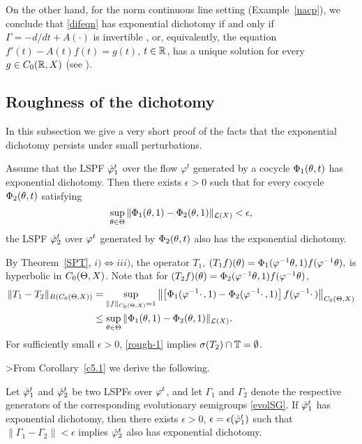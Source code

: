 On the other hand, for the norm continuous line setting
(Example~\ref{nacp}), we conclude that \eqref{difeqn} has
exponential dichotomy if and only if $\Gamma=-d/dt+A(\cdot)$ is
invertible \cite{Gohb,Palm}, or, equivalently,  the equation
$f'(t)-A(t)f(t)=g(t)$, $t\in{\Bbb{R}}$, has a unique solution for every
$g\in C_0({\Bbb{R}},X)$ (see \cite{DK,MS}).

\subsection{Roughness of the dichotomy}

In this subsection we give a very short proof of the facts that the
exponential dichotomy persists under small perturbations.

\begin{thm}
Assume that the LSPF ${\hat{\varphi}}^t_1$ over the flow $\varphi^t$
generated by a cocycle $\Phi_1(\theta,t)$ has exponential dichotomy.
Then there exists $\epsilon > 0$ such that for every cocycle
$\Phi_2(\theta,t)$ satisfying
\begin{equation}\lb{rough-1}
\sup\sb{\th\in \TH} \|\Phi_1(\th,1)-\Phi_2(\th,1) \|_{\calL(X)}<\epsilon,
\end{equation}
the LSPF ${\hat{\varphi}}^t_2$ over $\varphi^t$ generated by
$\Phi_2(\theta,t)$ also has the exponential dichotomy.
\end{thm}

\begin{pf}
By Theorem~\ref{SPT}, $i)\Leftrightarrow iii)$, the operator
$T_1$, $(T_1f)(\theta) = \Phi_1(\varphi^{-1}\theta,1) f(\varphi^{-1}\theta), $ is
hyperbolic in $C_0(\Theta,X)$.  Note that for $(T_2f)(\theta)=\Phi_2(\varphi^{-1}\theta,
1)f(\varphi^{-1}\theta)$,
$$\begin{aligned}
\|T_1 - T_2\|_{B(C_0(\Theta,X))} &= \sup\sb{\|f\|_{C_0(\Theta,X)}=1} \left\|\left[\Phi_1
(\varphi^{-1}\cdot\,,1)-\Phi_2(\varphi^{-1}\cdot\,,1)\right]
f(\varphi^{-1} \cdot\,)\right\|_{C_0(\Theta,X)}\\
&\le \sup_{\theta\in \Theta}\|\Phi_1(\theta,1) -\Phi_2(\theta,1)\|_{{\cal{L}}(X)}.
\end{aligned}$$
For sufficiently small $\epsilon >0$, \eqref{rough-1} implies
$\sigma(T_2)\cap{\Bbb{T}} =\emptyset$.
\end{pf}

>From Corollary~\ref{c5.1} we derive the following.

\begin{cor}  Let ${\hat{\varphi}}_1^t$ and ${\hat{\varphi}}_2^t$ be two LSPFs over $\varphi^t$,
and let $\Gamma_1$ and $\Gamma_2$ denote the respective generators of
the corresponding evolutionary semigroups \eqref{evolSG}.  If
${\hat{\varphi}}_1^t$  has exponential dichotomy, then there exists
$\epsilon>0$, $\epsilon=\epsilon({\hat{\varphi}}_1^t)$ such that
$\|\Gamma_1-\Gamma_2\|<\epsilon$ implies ${\hat{\varphi}}_2^t$ also has exponential
dichotomy. \end{cor}

